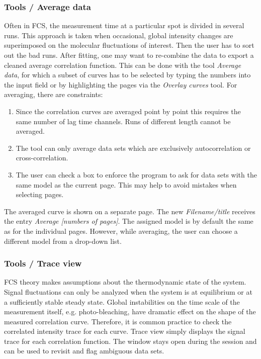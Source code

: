 \subsubsection{Tools / Average data}
\label{sec:menub.tools.avera}
Often in FCS, the measurement time at a particular spot is divided in several runs. This approach is taken when occasional, global intensity changes are superimposed on the molecular fluctuations of interest. Then the user has to sort out the bad runs. After fitting, one may want to re-combine the data to export a cleaned average correlation function. This can be done with the tool \textit{Average data}, for which a subset of curves has to be selected by typing the numbers into the input field or by highlighting the pages via the \textit{Overlay curves} tool. For averaging, there are constraints:


\begin{enumerate}
\item Since the correlation curves are averaged point by point this requires the same number of lag time channels. Runs of different length cannot be averaged.
\item The tool can only average data sets which are exclusively autocorrelation or cross-correlation.
\item The user can check a box to enforce the program to ask for data sets with the same model as the current page. This may help to avoid mistakes when selecting pages.
\end{enumerate}
The averaged curve is shown on a separate page. The new \textit{Filename/title} receives the entry \textit{Average [numbers of pages]}. The assigned model is by default the same as for the individual pages. However, while averaging, the user can choose a different model from a drop-down list. 

\subsubsection{Tools / Trace view}
\label{sec:menub.tools.trace}
FCS theory makes assumptions about the thermodynamic state of the system. Signal fluctuations can only be analyzed when the system is at equilibrium or at a sufficiently stable steady state. Global instabilities on the time scale of the measurement itself, e.g. photo-bleaching, have dramatic effect on the shape of the measured correlation curve. Therefore, it is common practice to check the correlated intensity trace for each curve. Trace view simply displays the signal trace for each correlation function. The window stays open during the session and can be used to revisit and flag ambiguous data sets.

